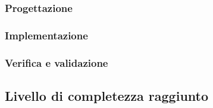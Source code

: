 \subsubsection{Progettazione}
\subsubsection{Implementazione}
\subsubsection{Verifica e validazione}

\subsection{Livello di completezza raggiunto}